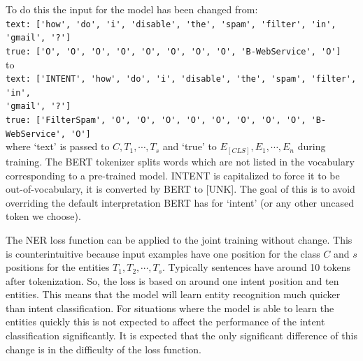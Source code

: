 To do this the input for the model has been changed from: \\

\noindent \verb|text: ['how', 'do', 'i', 'disable', 'the', 'spam', 'filter', 'in', 'gmail', '?']|\\
\verb|true: ['O', 'O', 'O', 'O', 'O', 'O', 'O', 'O', 'B-WebService', 'O']|\\

to\\

\noindent \verb|text: ['INTENT', 'how', 'do', 'i', 'disable', 'the', 'spam', 'filter', 'in',|\\
\hspace*{12cm} \verb|'gmail', '?']|\\
\verb|true: ['FilterSpam', 'O', 'O', 'O', 'O', 'O', 'O', 'O', 'O', 'B-WebService', 'O']|\\

where `text' is passed to $C, T_1, \cdots, T_s$ and `true' to $E_{[CLS]}, E_1, \cdots, E_n$ during training.
The BERT tokenizer splits words which are not listed in the vocabulary corresponding to a pre-trained model.
INTENT is capitalized to force it to be out-of-vocabulary, it is converted by BERT to [UNK].
The goal of this is to avoid overriding the default interpretation BERT has for `intent' (or any other uncased token we choose).

The NER loss function can be applied to the joint training without change.
This is counterintuitive because input examples have one position for the class $C$ and $s$ positions for the entities $T_1, T_2, \cdots, T_s$.
Typically sentences have around 10 tokens after tokenization.
So, the loss is based on around one intent position and ten entities.
This means that the model will learn entity recognition much quicker than intent classification.
For situations where the model is able to learn the entities quickly this is not expected to affect the performance of the intent classification significantly.
It is expected that the only significant difference of this change is in the difficulty of the loss function.
